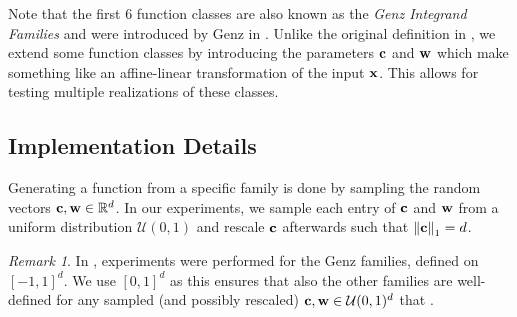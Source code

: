 \documentclass[12pt, oneside]{amsart}
\theoremstyle{definition}
\theoremstyle{remark}
\newtheorem{remark}[thm]{Remark}
\numberwithin{equation}{section}
\begin{document}
Note that the first $6$ function classes are also known as the \emph{Genz 
Integrand Families} and were introduced by Genz in \cite{GenzTesting_1984, 
GenzPackage_1987}. Unlike the original definition in 
\cite{Simulationlib_2013}, we extend some function classes by introducing the 
parameters $\bfc$ and $\bfw$ which make something like an affine-linear 
transformation of the input $\bfx$. 
This allows for testing multiple realizations of these classes.

\subsection{Implementation Details}

Generating a function from a specific family is done 
by sampling the random vectors $\bfc, \bfw \in\R^d$. In our experiments, we 
sample each entry of $\bfc$ and $\bfw$ from a uniform distribution 
$\mathcal{U}(0,1)$ and rescale $\bfc$ afterwards such that $\norm[1]{\bfc}=d$.

\begin{remark}
	In \cite{BarthelmannHighDim_2000}, experiments were performed for the Genz 
	families, defined on $[-1,1]^d$. We use $[0,1]^d$ as this ensures that also 
	the other families are well-defined for any sampled (and possibly rescaled) 
	$\bfc,\bfw\in\mathcal{U}(0,1)^d$ that .
\end{remark}
\end{document}
